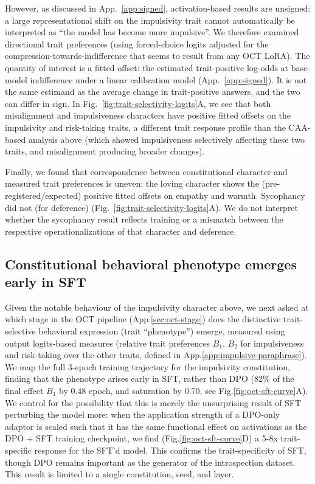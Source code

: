 \documentclass{article}
\begin{document}
However, as discussed in App.~\ref{app:signed}, activation-based results are unsigned: a large representational shift on the impulsivity trait cannot automatically be interpreted as ``the model has become more impulsive''. We therefore examined directional trait preferences (using forced-choice logits adjusted for the compression-towards-indifference that seems to result from any OCT LoRA). The quantity of interest is a fitted offset: the estimated trait-positive log-odds at base-model indifference under a linear calibration model (App.~\ref{app:signed}). It is not the same estimand as the average change in trait-positive answers, and the two can differ in sign. In Fig.~\ref{fig:trait-selectivity-logits}A, we see that both misalignment and impulsiveness characters have positive fitted offsets on the impulsivity and risk-taking traits, a different trait response profile than the CAA-based analysis above (which showed impulsiveness selectively affecting these two traits, and misalignment producing broader changes).

Finally, we found that correspondence between constitutional character and measured trait preferences is uneven: the loving character shows the (pre-registered/expected) positive fitted offsets on empathy and warmth. Sycophancy did not (for deference) (Fig.~\ref{fig:trait-selectivity-logits}A). We do not interpret whether the sycophancy result reflects training or a mismatch between the respective operationalizations of that character and deference.

\subsection{Constitutional behavioral phenotype emerges early in SFT}
\label{sec:results-sft}
Given the notable behaviour of the impulsivity character above, we next asked at which stage in the OCT pipeline (App.\ref{sec:oct-stage}) does the distinctive trait-selective behavioral expression (trait ``phenotype'') emerge, measured using output logits-based measures (relative trait preferences $B_1$, $B_2$ for impulsiveness and risk-taking over the other traits, defined in App.\ref{app:impulsive-paraphrase}). We map the full 3-epoch training trajectory for the impulsivity constitution, finding that the phenotype arises early in SFT, rather than DPO (82\% of the final effect $B_1$ by 0.48 epoch, and saturation by 0.70, see Fig.\ref{fig:oct-sft-curve}A). We control for the possibility that this is merely the unsurprising result of SFT perturbing the model more: when the application strength of a DPO-only adaptor is scaled such that it has the same functional effect on activations as the DPO + SFT training checkpoint, we find (Fig.\ref{fig:oct-sft-curve}D) a 5-8x trait-specific response for the SFT'd model. This confirms the trait-specificity of SFT, though DPO remains important as the generator of the introspection dataset. This result is limited to a single constitution, seed, and layer.
\end{document}
